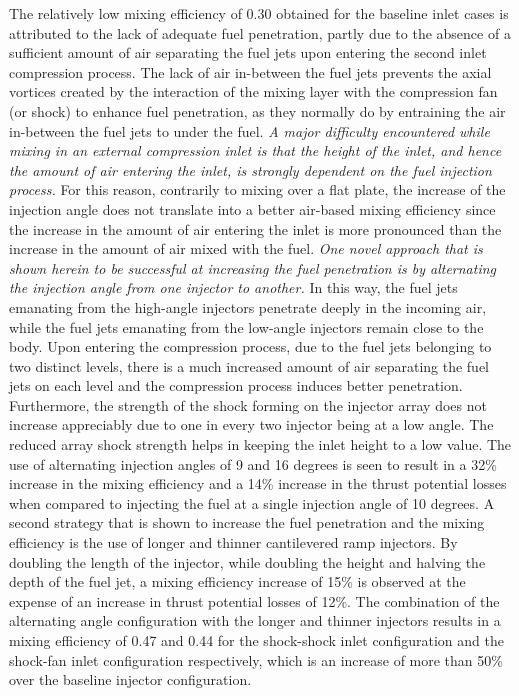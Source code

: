 The relatively low mixing efficiency of 0.30 obtained for the baseline inlet
cases is attributed to the lack of adequate fuel penetration, partly
due to the absence of a sufficient amount of air separating the fuel
jets upon entering the second inlet compression process. The lack
of air in-between the fuel jets prevents the axial vortices
created by the interaction of the mixing layer with the compression fan (or shock)
to enhance fuel penetration, as they normally do by entraining the air in-between
the fuel jets to under the fuel. \emph{A major difficulty encountered while mixing in
an external compression inlet is that the height of the inlet, and hence
the amount of air entering the inlet, is strongly dependent on the fuel injection process.}
For this reason, contrarily to mixing over a flat plate,
the increase of the injection angle does not translate into a better air-based mixing
efficiency since the increase in the amount of air entering the inlet is more
pronounced than the increase in the amount of air mixed with the fuel.
\emph{One novel approach that is shown
herein to be successful at increasing the fuel penetration
is by alternating the injection angle from
one injector to another.} In this way, the fuel jets emanating from
the high-angle injectors penetrate deeply in the incoming air, while the
fuel jets emanating from the low-angle injectors remain close to the body.
Upon entering the compression process, due to the fuel jets belonging
to two distinct levels, there is a much increased amount of air separating
the fuel jets on each level and the compression process induces better
penetration. Furthermore, the strength of the shock forming on the injector array
does not increase appreciably due to one in every two injector being at a low
angle. The reduced array shock strength  helps in keeping the inlet height
to a low value. The use of alternating injection angles of 9 and 16 degrees
is seen to result in a 32\% increase in the mixing efficiency and a 14\% increase
in the thrust potential losses when compared to injecting the fuel at a single injection
angle of 10 degrees. A second strategy that is shown to increase the fuel penetration
and the mixing efficiency is the use of longer and thinner cantilevered ramp injectors.
By doubling the length of the injector, while doubling the height and halving the depth
of the fuel
jet, a mixing efficiency increase of 15\% is observed at the expense of an increase
in thrust potential losses of 12\%. The combination of the alternating angle
configuration with the longer and thinner injectors results in a mixing efficiency
of 0.47 and 0.44 for the shock-shock inlet configuration and the shock-fan inlet
configuration respectively, which is an increase of more than 50\% over the baseline
injector configuration.



